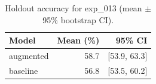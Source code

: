 \begin{table}[ht]
\centering
\caption{Holdout accuracy for exp_013 (mean $\pm$ 95\% bootstrap CI).}
\label{tab:exp_013}
\begin{tabular}{lrr}
\toprule
Model & Mean (\%) & 95\% CI \\
\midrule
augmented & 58.7 & [53.9, 63.3] \\
baseline & 56.8 & [53.5, 60.2] \\
\bottomrule
\end{tabular}
\end{table}
